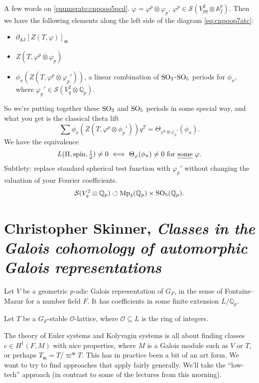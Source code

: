 \documentclass[reqno]{amsart} 
\begin{document}
A few words on \eqref{enumerate:cnpooo5pcd}.  $\varphi = \varphi^p \otimes \varphi_p$, $\varphi^p \in \mathcal{S}(V_{p q}^2 \otimes \mathbb{A}_f^p)$.  Then we have the following elements along the left side of the diagram \eqref{eq:cnpoop7atc}:
\begin{itemize}
\item $\partial_{\mathrm{AJ}}[Z(T, \varphi)]_{\mathfrak{m}}$
\item $Z(T, \varphi^p \otimes \varphi_p)$
\item $\phi_\pi(Z(T, \varphi^p \otimes \varphi_{p}'))$, a linear combination of $\operatorname{SO}_3$-$\operatorname{SO}_5$ periods for $\phi_\pi$, where
  $\varphi_{p}' \in \mathcal{S}(V_q^2 \otimes \mathbb{Q}_p)$.
\end{itemize}
So we're putting together these $\operatorname{SO}_3$ and $\operatorname{SO}_5$ periods in some special way, and what you get is the classical theta lift
\begin{equation*}
  \sum \phi_\pi(Z(T, \varphi^p \otimes \phi_{p} ')) q^T =
  \Theta_{\varphi^p \otimes \varphi_p '}(\phi_\pi).
\end{equation*}
We have the equivalence
\begin{equation*}
  L(\Pi, \mathrm{spin}, \tfrac{1}{2}) \neq 0 \iff \Theta_{\varphi}(\phi_\pi) \neq 0 \text{ for \emph{some} } \varphi.
\end{equation*}
Subtlety: replace standard spherical test function with $\varphi_p '$ without changing the valuation of your Fourier coefficients.
\begin{equation*}
  \mathcal{S}(V_q^2 \otimes \mathbb{Q}_p) \circlearrowleft \operatorname{Mp}_4(\mathbb{Q}_p) \times \operatorname{SO}_5(\mathbb{Q}_p).
\end{equation*}


\part{Christopher Skinner, \emph{Classes in the Galois cohomology of automorphic Galois representations}}

Let $V$ be a geometric $p$-adic Galois representation of $G_F$, in the sense of Fontaine--Mazur for a number field $F$.  It has coefficients in some finite extension $L/ \mathbb{Q}_p$.

Let $T$ be a $G_F$-stable $\mathcal{O}$-lattice, where $\mathcal{O} \subseteq L$ is the ring of integers.

The theory of Euler systems and Kolyvagin systems is all about finding classes $c \in H^1(F, M)$ with nice properties, where $M$ is a Galois module such as $V$ or $T$, or perhaps $T_{\mathfrak{m}} = T / \varpi^{\mathfrak{m}} T$.  This has in practice been a bit of an art form.  We want to try to find approaches that apply fairly generally.  We'll take the ``low-tech'' approach (in contrast to some of the lectures from this morning).
\end{document}
